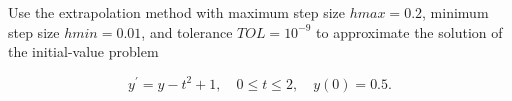 %
%
%

\begin{example}
Use the extrapolation method with maximum step size $h m a x=0.2$, minimum step size $h m i n=0.01$, and tolerance $T O L=10^{-9}$ to approximate the solution of the initial-value problem

$$
y^{\prime}=y-t^{2}+1, \quad 0 \leq t \leq 2, \quad y(0)=0.5 .
$$
\end{example}

